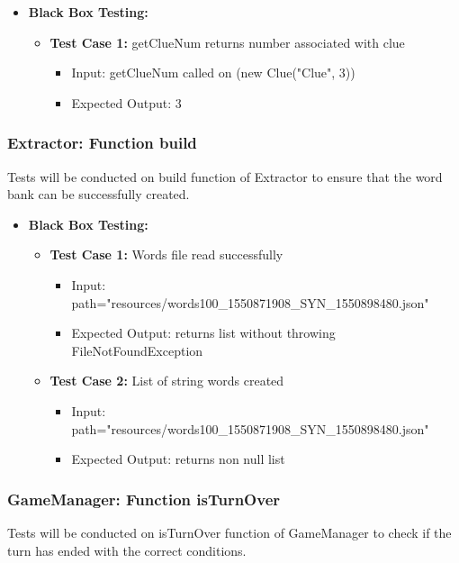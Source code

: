 \documentclass[12pt]{article}
\begin{document}
\begin{itemize}
    \item \textbf{Black Box Testing:}
    \begin{itemize}
    \item \textbf{Test Case 1:} getClueNum returns number associated with clue
            \begin{itemize}
            \item Input: getClueNum called on (new Clue("Clue", 3))
            \item Expected Output: 3
        \end{itemize}
    \end{itemize}
\end{itemize}



\subsubsection{Extractor: Function build}
Tests will be conducted on build function of Extractor to ensure that the word bank can be successfully created.

\begin{itemize}
    \item \textbf{Black Box Testing:}
    \begin{itemize}
        \item \textbf{Test Case 1:} Words file read successfully
            \begin{itemize}
            \item Input: path="resources/words100\_1550871908\_SYN\_1550898480.json"
            \item Expected Output: returns list without throwing FileNotFoundException
        \end{itemize}
        \item \textbf{Test Case 2:} List of string words created
            \begin{itemize}
            \item Input: path="resources/words100\_1550871908\_SYN\_1550898480.json"
            \item Expected Output: returns non null list
        \end{itemize}
    \end{itemize}
\end{itemize}


\subsubsection{GameManager: Function isTurnOver}
Tests will be conducted on isTurnOver function of GameManager to check if the turn has ended with the correct conditions.
\end{document}
